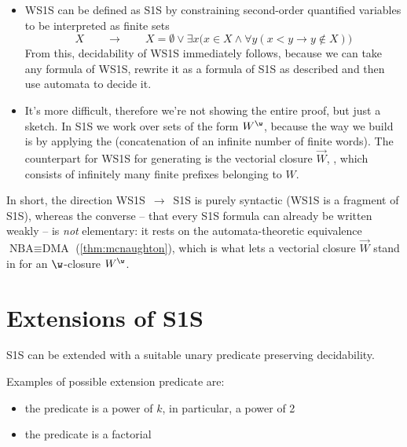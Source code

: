 \documentclass[oneside]{academica}
\begin{document}
\begin{proof*}
  \begin{itemize}
    \item[\color{pink!200}$\Leftarrow$] WS1S can be defined as S1S by constraining second-order quantified variables to be interpreted as finite sets
      \begin{equation*}
        X \qquad \to \qquad X = \emptyset \lor \exists x \big(x \in X \land \forall y (x<y \to y \notin X)\big)
      \end{equation*}
      From this, decidability of WS1S immediately follows, because we can take any formula of WS1S, rewrite it as a formula of S1S as described and then use \Buchi automata to decide it.
    \item[\color{pink!200}$\Rightarrow$] It's more difficult, therefore we're not showing the entire proof, but just a sketch.
      In S1S we work over sets of the form $W^\w$, because the way we build \wwords is by applying the \wclo (concatenation of an infinite number of finite words).
      The counterpart for WS1S for generating \wwords is the vectorial closure $\overrightarrow{W}$, \ie, \wwords which consists of infinitely many finite prefixes belonging to $W$.
  \end{itemize}
  In short, the direction WS1S~$\to$~S1S is purely syntactic (WS1S is a fragment of S1S), whereas the converse -- that every S1S formula can already be written weakly -- is \emph{not} elementary: it rests on the automata-theoretic equivalence $\text{NBA} \equiv \text{DMA}$ (\autoref{thm:mcnaughton}), which is what lets a vectorial closure $\overrightarrow{W}$ stand in for an $\w$-closure $W^\w$.
\end{proof*}

\section{Extensions of S1S}

S1S can be extended with a suitable unary predicate preserving decidability.

\begin{example*}
  Examples of possible extension predicate are:
  \begin{itemize}
    \item the predicate is a power of $k$, in particular, a power of 2
    \item the predicate is a factorial
  \end{itemize}
\end{example*}
\end{document}
